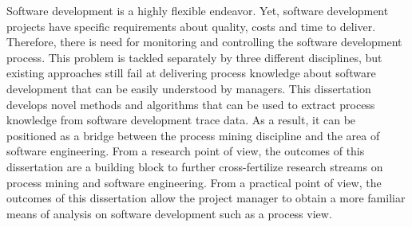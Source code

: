 
Software development is a highly flexible endeavor. Yet, software development projects
have specific requirements about quality, costs and time to deliver. Therefore, there is need
for monitoring and controlling the software development process. This problem is tackled
separately by three different disciplines, but existing approaches still fail at delivering process
knowledge about software development that can be easily understood by managers. This
dissertation develops novel methods and algorithms that can be used to extract process
knowledge from software development trace data. As a result, it can be positioned as a
bridge between the process mining discipline and the area of software engineering. From
a research point of view, the outcomes of this dissertation are a building block to further
cross-fertilize research streams on process mining and software engineering. From a practical
point of view, the outcomes of this dissertation allow the project manager to obtain a more
familiar means of analysis on software development such as a process view.


